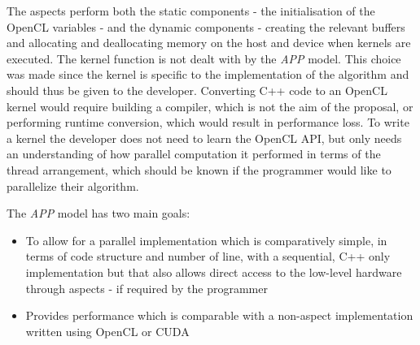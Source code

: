 \documentclass{sig-alternate-05-2015}
\begin{document}
The aspects perform both the static components - the initialisation of the
OpenCL variables - and the dynamic components - creating the relevant buffers
and allocating and deallocating memory on the host and device when kernels are
executed. The kernel function is not dealt with by the \textit{APP} model. This
choice was made since the kernel is specific to the implementation of the
algorithm and should thus be given to the developer. Converting C++ code to an
OpenCL kernel would require building a compiler, which is not the aim of the
proposal, or performing runtime conversion, which would result in performance
loss. To write a kernel the developer does not need to learn the OpenCL API, but
only needs an understanding of how parallel computation it performed in terms of
the thread arrangement, which should be known if the programmer would like to
parallelize their algorithm. 

The \textit{APP} model has two main goals:
\begin{itemize}
	\item{To allow for a parallel implementation 
			which is comparatively simple, in terms of code structure and number
			of line, with a sequential, C++ only implementation 
			but that also allows direct access to the low-level hardware
			through aspects - if required by the programmer
		}
	\item{Provides performance which is comparable with a non-aspect
			implementation written using OpenCL or CUDA
		}
\end{itemize}
\end{document}
